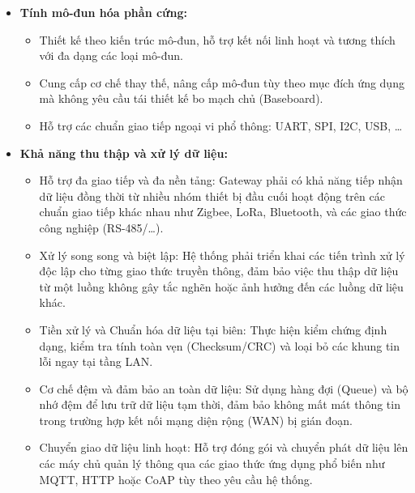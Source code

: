         \begin{itemize}
            \item \textbf{Tính mô-đun hóa phần cứng:}
            \begin{itemize}
                \item Thiết kế theo kiến trúc mô-đun, hỗ trợ kết nối linh hoạt và tương thích với đa dạng các loại mô-đun.
                \item Cung cấp cơ chế thay thế, nâng cấp mô-đun tùy theo mục đích ứng dụng mà không yêu cầu tái thiết kế bo mạch chủ (Baseboard).
                \item Hỗ trợ các chuẩn giao tiếp ngoại vi phổ thông: UART, SPI, I2C, USB, \dots
            \end{itemize}
            
            \item \textbf{Khả năng thu thập và xử lý dữ liệu:}
            \begin{itemize}
                \item Hỗ trợ đa giao tiếp và đa nền tảng: Gateway phải có khả năng tiếp nhận dữ liệu đồng thời từ nhiều nhóm thiết bị đầu cuối hoạt động trên các chuẩn giao tiếp khác nhau như Zigbee, LoRa, Bluetooth, và các giao thức công nghiệp (RS-485/\ldots).
                \item Xử lý song song và biệt lập: Hệ thống phải triển khai các tiến trình xử lý độc lập cho từng giao thức truyền thông, đảm bảo việc thu thập dữ liệu từ một luồng không gây tắc nghẽn hoặc ảnh hưởng đến các luồng dữ liệu khác.
                \item Tiền xử lý và Chuẩn hóa dữ liệu tại biên: Thực hiện kiểm chứng định dạng, kiểm tra tính toàn vẹn (Checksum/CRC) và loại bỏ các khung tin lỗi ngay tại tầng LAN.
                \item Cơ chế đệm và đảm bảo an toàn dữ liệu: Sử dụng hàng đợi (Queue) và bộ nhớ đệm để lưu trữ dữ liệu tạm thời, đảm bảo không mất mát thông tin trong trường hợp kết nối mạng diện rộng (WAN) bị gián đoạn.
                \item Chuyển giao dữ liệu linh hoạt: Hỗ trợ đóng gói và chuyển phát dữ liệu lên các máy chủ quản lý thông qua các giao thức ứng dụng phổ biến như MQTT, HTTP hoặc CoAP tùy theo yêu cầu hệ thống.
            \end{itemize}
            

\end{itemize}
